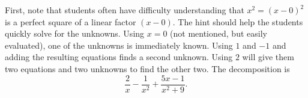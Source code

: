\documentclass[handout,instructornotes]{ximera}
\begin{document}
\begin{instructorNotes}
First, note that students often have difficulty understanding that $x^2 = (x-0)^2$ is a perfect square of a linear factor $(x-0)$.  
The hint should help the students quickly solve for the unknowns.  
Using $x=0$ (not mentioned, but easily evaluated), one of the unknowns is immediately known.  
Using $1$ and $-1$ and adding the resulting equations finds a second unknown.  
Using $2$ will give them two equations and two unknowns to find the other two.  
The decomposition is
	\[
	\frac{2}{x} - \frac{1}{x^2} + \frac{5x-1}{x^2 + 9}.
	\]
\end{instructorNotes}
\end{document}
